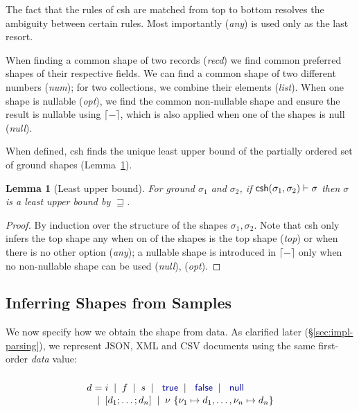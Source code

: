 \documentclass[pldi-cameraready]{sigplanconf-pldi16}
\newcommand{\kvd}[1]{\textnormal{\textcolor{kvdclr}{\sffamily #1}}}
\newcommand{\ident}[1]{\textnormal{\sffamily #1}}
\newcommand{\lsep}[0]{\;\; | \;\;}
\newcommand{\narrow}[1]{\hspace{-0.7em} #1 \hspace{-0.7em}}
\newcommand{\addopt}[1]{\lceil#1\rceil}
\newtheorem{lemma}[theorem]{Lemma}
\begin{document}
\noindent
The fact that the rules of \ident{csh} are matched from top to bottom resolves the ambiguity
between certain rules. Most importantly (\emph{any}) is used only as the last resort.

When finding a common shape of two records (\emph{recd}) we find common preferred shapes of their
respective fields. We can find a common shape of two different numbers (\emph{num}); for two collections,
we combine their elements (\emph{list}). When one shape is nullable (\emph{opt}), we find
the common non-nullable shape and ensure the result is nullable using $\addopt{-}$, which
is also applied when one of the shapes is \kvd{null} (\emph{null}).

When defined, \ident{csh} finds the unique least upper bound of the partially ordered
set of ground shapes (Lemma~\ref{thm:lub}).

\begin{lemma}[Least upper bound]
\label{thm:lub}
For ground $\sigma_1$ and $\sigma_2$, if $\ident{csh}(\sigma_1, \sigma_2) \vdash \sigma$ then $\sigma$ is a least upper bound by $\sqsupseteq$.
\end{lemma}
\begin{proof}
By induction over the structure of the shapes $\sigma_1,\sigma_2$. Note that \ident{csh} only infers the top shape
\kvd{any} when on of the shapes is the top shape (\emph{top}) or when there is no other option
(\emph{any}); a nullable shape is introduced in $\addopt{-}$ only when no non-nullable shape can
be used (\emph{null}), (\emph{opt}).
\end{proof}

\subsection{Inferring Shapes from Samples}
\label{sec:formal-inferval}

We now specify how we obtain the shape from data. As clarified later (\S\ref{sec:impl-parsing}),
we represent JSON, XML and CSV documents using the same first-order \emph{data} value:

\noindent
\begin{equation*}
\begin{array}{lcl}
  \\[-0.5em]
 d &\narrow{=}& i \lsep f \lsep s \lsep \kvd{true} \lsep \kvd{false} \lsep \kvd{null} \\[0.1em]
   &\narrow{|}& [d_1; \ldots; d_n] \lsep \nu~\{ \nu_1 \mapsto d_1, \ldots, \nu_n \mapsto d_n \}
\end{array}
\end{equation*}
\end{document}
